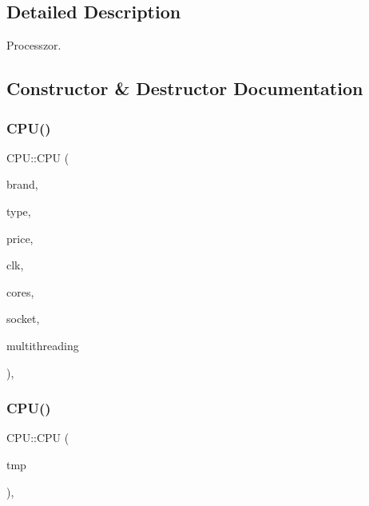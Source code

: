 \subsection{Detailed Description}
Processzor. 

\subsection{Constructor \& Destructor Documentation}
\mbox{\label{class_c_p_u_a1aa85a6c976fe5b665dcb9fd6d8fdd1e}} 
\subsubsection{\texorpdfstring{CPU()}{CPU()}\hspace{0.1cm}{\footnotesize\ttfamily [1/2]}}
{\footnotesize\ttfamily C\+P\+U\+::\+C\+PU (\begin{DoxyParamCaption}\item[{\mbox{\hyperlink{class_string}{String}}}]{brand,  }\item[{\mbox{\hyperlink{class_string}{String}}}]{type,  }\item[{int}]{price,  }\item[{int}]{clk,  }\item[{int}]{cores,  }\item[{\mbox{\hyperlink{class_string}{String}}}]{socket,  }\item[{bool}]{multithreading }\end{DoxyParamCaption})\hspace{0.3cm}{\ttfamily [inline]}, {\ttfamily [explicit]}}

\mbox{\label{class_c_p_u_a9147d84f815b9a242ba618877e6b2673}} 
\subsubsection{\texorpdfstring{CPU()}{CPU()}\hspace{0.1cm}{\footnotesize\ttfamily [2/2]}}
{\footnotesize\ttfamily C\+P\+U\+::\+C\+PU (\begin{DoxyParamCaption}\item[{\mbox{\hyperlink{struct_temp_input}{Temp\+Input}} \&}]{tmp }\end{DoxyParamCaption})\hspace{0.3cm}{\ttfamily [inline]}, {\ttfamily [explicit]}}



